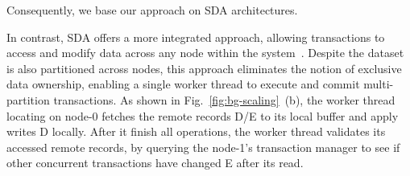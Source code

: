 Consequently, we base our approach on SDA architectures. 















In contrast, SDA offers a more integrated approach, allowing transactions to access and modify data across any node within the system~\cite{mtcp_nsdi14, xenic_sosp21, ipipe_sigcomm19, linefs_sosp21, fasst, drtmh, grappa_atc15, mtcp_nsdi14, drtm}. Despite the dataset is also partitioned across nodes, this approach eliminates the notion of exclusive data ownership, enabling a single worker thread to execute and commit multi-partition transactions. As shown in Fig.~\ref{fig:bg-scaling}~(b), the worker thread locating on node-0 fetches the remote records D/E to its local buffer and apply writes D locally. 
After it finish all operations, the worker thread validates its accessed remote records, by querying the node-1's transaction manager to see if other concurrent transactions have changed E after its read. 

